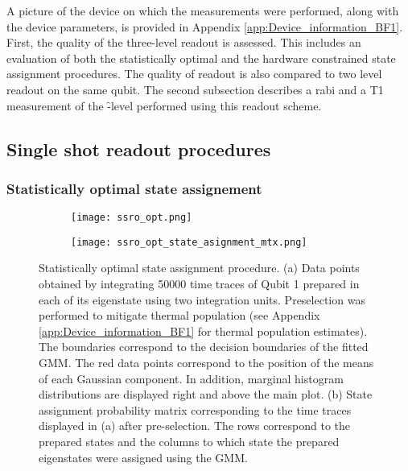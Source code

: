 A picture of the device on which the measurements were performed, along with the device parameters, is provided in Appendix \ref{app:Device_information_BF1}. First, the quality of the three-level readout is assessed. This includes an evaluation of both the statistically optimal and the hardware constrained state assignment procedures. The quality of readout is also compared to two level readout on the same qubit. The second subsection describes a rabi and a T1 measurement of the \f-level performed using this readout scheme.
\subsection{Single shot readout procedures}
\subsubsection{Statistically optimal state assignement} \label{s:exp_statistically_opt_state_assignement}
\begin{figure}[t]
  \centering
  \begin{subfigure}[t]{0.50\textwidth}
     \centering 
     \texttt{[image: ssro\_opt.png]}
     \caption{ }
     \label{fig:ssro_opt_shots}
  \end{subfigure}
  \hspace{5pt}
  \begin{subfigure}[t]{0.36\textwidth}
     \centering 
     \texttt{[image: ssro\_opt\_state\_asignment\_mtx.png]}
     \caption{ }
     \label{fig:ssro_opt_state_asignment_mtx}
  \end{subfigure}
   \caption{Statistically optimal state assignment procedure. (a) Data points obtained by integrating 50000 time traces of Qubit 1 prepared in each of its eigenstate using two integration units. Preselection was performed to mitigate thermal population (see Appendix \ref{app:Device_information_BF1} for thermal population estimates). The boundaries correspond to the decision boundaries of the fitted GMM. The red data points correspond to the position of the means of each Gaussian component. In addition, marginal histogram distributions are displayed right and above the main plot. (b) State assignment probability matrix corresponding to the time traces displayed in (a) after pre-selection. The rows correspond to the prepared states and the columns to which state the prepared eigenstates were assigned using the GMM.}
  \label{fig:ssro_opt}
\end{figure}
